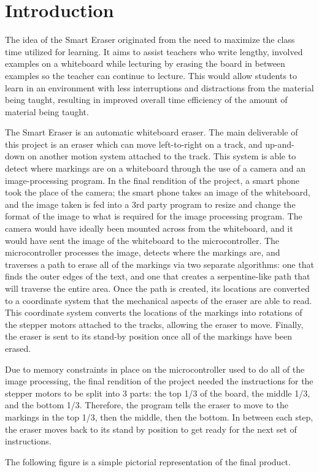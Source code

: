  \section{Introduction}
 The idea of the Smart Eraser originated from the need to maximize the class time utilized for learning. It aims to assist teachers who write lengthy, involved examples on a whiteboard while lecturing by erasing the board in between examples so the teacher can continue to lecture. This would allow students to learn in an environment with less interruptions and distractions from the material being taught, resulting in improved overall time efficiency of the amount of material being taught.
 \par
\setlength{\parindent}{2.5ex}The Smart Eraser is an automatic whiteboard eraser. The main deliverable of this project is an eraser which can move left-to-right on a track, and up-and-down on another motion system attached to the track. This system is able to detect where markings are on a whiteboard through the use of a camera and an image-processing program. In the final rendition of the project, a smart phone took the place of the camera; the smart phone takes an image of the whiteboard, and the image taken is fed into a 3rd party program to resize and change the format of the image to what is required for the image processing program. The camera would have ideally been mounted across from the whiteboard, and it would have sent the image of the whiteboard to the microcontroller. The microcontroller processes the image, detects where the markings are, and traverses a path to erase all of the markings via two separate algorithms: one that finds the outer edges of the text, and one that creates a serpentine-like path that will traverse the entire area. Once the path is created, its locations are converted to a coordinate system that the mechanical aspects of the eraser are able to read. This coordinate system converts the locations of the markings into rotations of the stepper motors attached to the tracks, allowing the eraser to move. Finally, the eraser is sent to its stand-by position once all of the markings have been erased. \par
\setlength{\parindent}{2.5ex}Due to memory constraints in place on the microcontroller used to do all of the image processing, the final rendition of the project needed the instructions for the stepper motors to be split into 3 parts: the top 1/3 of the board, the middle 1/3, and the bottom 1/3. Therefore, the program tells the eraser to move to the markings in the top 1/3, then the middle, then the bottom. In between each step, the eraser moves back to its stand by position to get ready for the next set of instructions. 
\newpage
\par
\setlength{\parindent}{2.5ex}The following figure is a simple pictorial representation of the final product.


